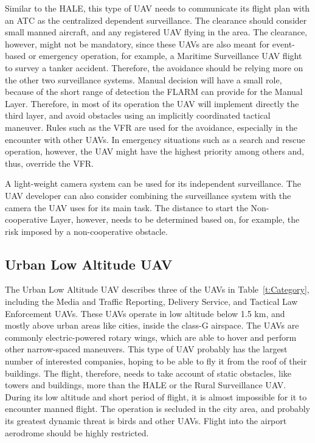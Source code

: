 Similar to the HALE, this type of UAV needs to communicate its flight plan with an ATC as the centralized dependent surveillance. The clearance should consider small manned aircraft, and any registered UAV flying in the area. The clearance, however, might not be mandatory, since these UAVs are also meant for event-based or emergency operation, for example, a Maritime Surveillance UAV flight to survey a tanker accident. Therefore, the avoidance should be relying more on the other two surveillance systems. Manual decision will have a small role, because of the short range of detection the FLARM can provide for the Manual Layer. Therefore, in most of its operation the UAV will implement directly the third layer, and avoid obstacles using an implicitly coordinated tactical maneuver. Rules such as the VFR are used for the avoidance, especially in the encounter with other UAVs. In emergency situations such as a search and rescue operation, however, the UAV might have the highest priority among others and, thus, override the VFR. 

A light-weight camera system can be used for its independent surveillance. The UAV developer can also consider combining the surveillance system with the camera the UAV uses for its main task. The distance to start the Non-cooperative Layer, however, needs to be determined based on, for example, the risk imposed by a non-cooperative obstacle.

\subsection{Urban Low Altitude UAV}
The Urban Low Altitude UAV describes three of the UAVs in Table~\ref{t:Category}, including the Media and Traffic Reporting\cite{Frew:04}, Delivery Service\cite{D'Andrea:14}, and Tactical Law Enforcement UAVs\cite{Herwitz:04}. These UAVs operate in low altitude below 1.5 km, and mostly above urban areas like cities, inside the class-G airspace. The UAVs are commonly electric-powered rotary wings, which are able to hover and perform other narrow-spaced maneuvers. This type of UAV probably has the largest number of interested companies, hoping to be able to fly it from the roof of their buildings. The flight, therefore, needs to take account of static obstacles, like towers and buildings, more than the HALE or the Rural Surveillance UAV. During its low altitude and short period of flight, it is almost impossible for it to encounter manned flight. The operation is secluded in the city area, and probably its greatest dynamic threat is birds and other UAVs. Flight into the airport aerodrome should be highly restricted.

